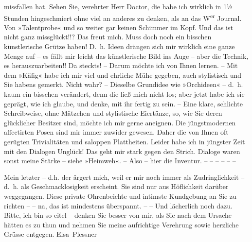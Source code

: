                missfallen hat. Sehen Sie, verehrter Herr Doctor, die habe ich wirklich in 1½ Stunden
               hingeschmiert ohne viel an anderes zu denken, als an das W\textsuperscript{er} Journal. Von »Talentprobe«
               und so weiter gar keinen Schimmer im Kopf. Und das ist nicht ganz missglückt!!? Das
               freut mich. Muss doch noch ein bisschen künstlerische Grütze haben! D. h. Ideen
               drängen sich mir wirklich eine ganze Menge auf – es fällt mir leicht das
               künstlerische Bild ins Auge – aber die Technik, es herauszuarbeiten!! Da steckts! –
               Darum möchte ich von Ihnen lernen. – Mit dem »Käfig« habe ich mir viel und ehrliche Mühe gegeben, auch stylistisch und Sie
               habens gemerkt. Nicht wahr? – Dieselbe Grundidee wie »Orchideen« – d. h. kaum ein bisschen verändert, denn die
               ließ mich nicht los; aber jetzt habe ich sie geprägt, wie ich glaube, und denke, mit
               ihr fertig zu sein. – Eine klare, schlichte Schreibweise, ohne Mätzchen und
               stylistische Eiertänze, so, wie Sie deren glücklicher Besitzer sind, möchte ich mir
               gerne aneignen. Die jüngstmodernen affectirten Posen sind mir immer zuwider gewesen.
               Daher die von Ihnen oft gerügten Trivialitäten und saloppen Plattheiten. Leider habe
               ich in jüngster Zeit mit den Dialogen Unglück! Das geht mir stark gegen
               den Strich. Dialoge waren sonst meine Stärke – siehe »Heimweh«. – Also – hier die Inventur. – – – – – – \pend
           
\pstart
           Mein letzter – d.h. der \label{K_L03713-4v}\label{K_L03713-4} ärgert mich, weil er mir
               noch immer als Zudringlichkeit – d. h. als Geschmacklosigkeit erscheint. Sie sind nur
               aus Höflichkeit darüber weggegangen. Diese private Ohrenbeichte und intimste  Kundgebung an Sie zu richten – – na, das ist
               mindestens überspannt. – – Und lächerlich noch dazu. Bitte, ich bin so eitel – denken
               Sie besser von mir, als Sie nach dem \label{K_L03713-5v}\label{K_L03713-5} Ursache hätten es zu thun
               und nehmen Sie meine aufrichtige Verehrung sowie herzliche Grüsse entgegen.\pend
           \pstart \spacefill\mbox{Elsa Plessner}\pend{}\endnumbering{}
\begin{anhang}
\end{anhang}
      
